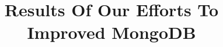 \documentclass{../dependencies/acm_proc_article-sp}
\begin{document}
\title{ Results Of Our Efforts To Improved MongoDB }
%
%
%
%
%
\end{document}
